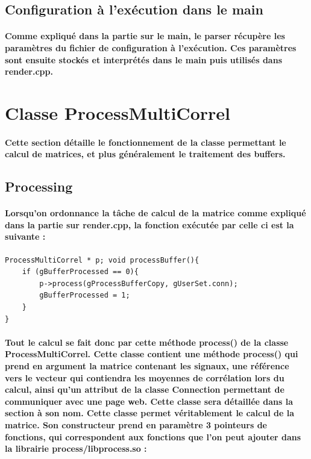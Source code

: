 \documentclass[a4paper]{article}
\begin{document}
\subsection{Configuration à l'exécution dans le main} \paragraph{Comme expliqué
dans la partie sur le main, le parser récupère les paramètres du fichier de
configuration à l’exécution. Ces paramètres sont ensuite stockés et interprétés
dans le main puis utilisés dans render.cpp.}

\section{Classe ProcessMultiCorrel} \paragraph{Cette section détaille le
fonctionnement de la classe permettant le calcul de matrices, et plus
généralement le traitement des buffers.}

\subsection{Processing} \paragraph{Lorsqu’on ordonnance la tâche de calcul de la
matrice comme expliqué dans la partie sur render.cpp, la fonction exécutée par
celle ci est la suivante :}

\begin{Verbatim}
ProcessMultiCorrel * p; void processBuffer(){
	if (gBufferProcessed == 0){
    	p->process(gProcessBufferCopy, gUserSet.conn);
    	gBufferProcessed = 1;
	}
}
\end{Verbatim}

\paragraph{Tout le calcul se fait donc par cette méthode process() de la classe
ProcessMultiCorrel. Cette classe contient une méthode process() qui prend en
argument la matrice contenant les signaux, une référence vers le vecteur qui
contiendra les moyennes de corrélation lors du calcul, ainsi qu’un attribut de
la classe Connection permettant de communiquer avec une page web. Cette classe
sera détaillée dans la section à son nom. Cette classe permet véritablement le
calcul de la matrice. Son constructeur prend en paramètre 3 pointeurs de
fonctions, qui correspondent aux fonctions que l’on peut ajouter dans la
librairie process/libprocess.so :}
\end{document}
